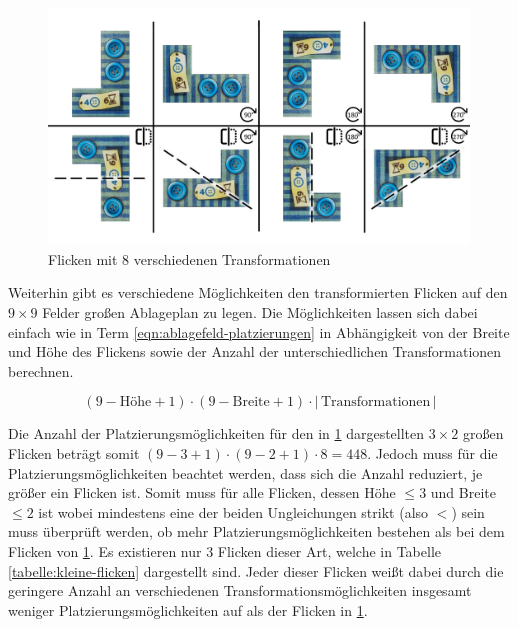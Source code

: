 \begin{figure}[!ht]
    \centering
    \includegraphics[width=0.995\textwidth]{res/pictures/diedergruppe.pdf}
    \vspace*{-0.5cm}
    \caption{Flicken mit 8 verschiedenen Transformationen}
    \label{fig:diedergruppe}
\end{figure}

Weiterhin gibt es verschiedene Möglichkeiten den transformierten Flicken auf den $9\times9$ Felder großen Ablageplan zu legen. Die Möglichkeiten lassen sich dabei einfach wie in Term \ref{eqn:ablagefeld-platzierungen} in Abhängigkeit von der Breite und Höhe des Flickens sowie der Anzahl der unterschiedlichen Transformationen berechnen.

\vspace*{-0.45cm}
\begin{equation}
    \label{eqn:ablagefeld-platzierungen}
    \left( 9 - \text{Höhe}  + 1 \right) \cdot
    \left( 9 - \text{Breite} + 1 \right) \cdot
    \left\lvert\, \text{Transformationen} \,\right\rvert
\end{equation}

Die Anzahl der Platzierungsmöglichkeiten für den in \ref{fig:diedergruppe} dargestellten $3\times 2$ großen Flicken beträgt somit $\left( 9 - 3 + 1 \right) \cdot \left( 9 - 2 + 1 \right) \cdot 8 = 448$. Jedoch muss für die Platzierungsmöglichkeiten beachtet werden, dass sich die Anzahl reduziert, je größer ein Flicken ist. Somit muss für alle Flicken, dessen Höhe $\le 3$ und Breite $\le 2$ ist \textemdash{} wobei mindestens eine der beiden Ungleichungen strikt (also $<$) sein muss \textemdash{} überprüft werden, ob mehr Platzierungsmöglichkeiten bestehen als bei dem Flicken von \ref{fig:diedergruppe}. Es existieren nur 3 Flicken dieser Art, welche in Tabelle \ref{tabelle:kleine-flicken} dargestellt sind. Jeder dieser Flicken weißt dabei durch die geringere Anzahl an verschiedenen Transformationsmöglichkeiten insgesamt weniger Platzierungsmöglichkeiten auf als der Flicken in \ref{fig:diedergruppe}.

